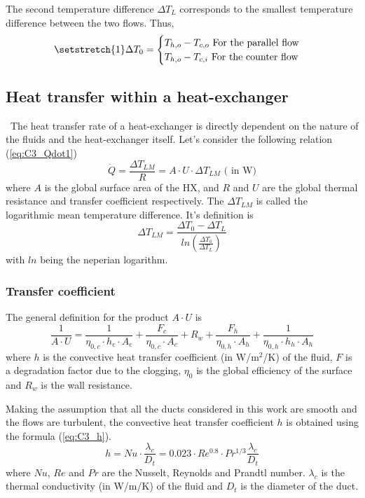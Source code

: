 The second temperature difference $\Delta T_L$ corresponds to the smallest temperature difference between the two flows. Thus,
\begin{equation}
\setstretch{1}
\Delta T_0 =
\begin{cases}
T_{h,o} - T_{c,o} \text{ For the parallel flow}\\
T_{h,o} - T_{c,i} \text{ For the counter flow}\\
\end{cases}\label{eq:C3_DTL}
\end{equation}

\subsection{Heat transfer within a heat-exchanger}
\quad\, The heat transfer rate of a heat-exchanger is directly dependent on the nature of the fluids and the heat-exchanger itself. Let's consider the following relation (\ref{eq:C3_Qdot1})
\begin{equation}
\dot{Q} = \frac{\Delta T_{LM}}{R}= A\cdot U\cdot \Delta T_{LM}\text{ ( in W)}\label{eq:C3_Qdot1}
\end{equation}
where $A$ is the global surface area of the HX, and $R$ and $U$ are the global thermal resistance and transfer coefficient respectively. The $\Delta T_{LM}$ is called the logarithmic mean temperature difference. It's definition is
\begin{equation}
\Delta T_{LM} = \frac{\Delta T_0-\Delta T_L}{ln\left(\frac{\Delta T_0}{\Delta T_L}\right)}\label{eq:C3_lmtd}
\end{equation} 
with $ln$ being the neperian logarithm.
\subsubsection{Transfer coefficient}
The general definition for the product $A\cdot U$ is 
\begin{equation}
\frac{1}{A\cdot U}  = \frac{1}{\eta_{0,c}\cdot h_c \cdot A_c} + \frac{F_c}{\eta_{0,c}\cdot A_c} + R_w + \frac{F_h}{\eta_{0,h}\cdot A_h} + \frac{1}{\eta_{0,h}\cdot h_h \cdot A_h}\label{eq:C3_AU}
\end{equation}
where $h$ is the convective heat transfer coefficient (in W/m$^2$/K) of the fluid, $F$ is a degradation factor due to the clogging, $\eta_0$ is the global efficiency of the surface and $R_w$ is the wall resistance. 

Making the assumption that all the ducts considered in this work are smooth and the flows are turbulent, the convective heat transfer coefficient $h$ is obtained using the formula (\ref{eq:C3_h}).
\begin{equation}
h = Nu \cdot \frac{\lambda_c}{D_t} = 0.023\cdot Re^{0.8}\cdot Pr^{1/3}\frac{\lambda_c}{D_t}\label{eq:C3_h}
\end{equation}
where $Nu$, $Re$ and $Pr$ are the Nusselt, Reynolds and Prandtl number. $\lambda_c$ is the thermal conductivity (in W/m/K) of the fluid and $D_t$ is the diameter of the duct\citep{Ngendakumana2018}.

